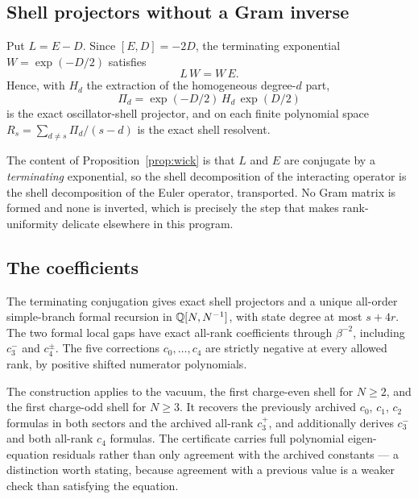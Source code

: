 \subsection{Shell projectors without a Gram inverse}

\begin{proposition}
\label{prop:wick}
Put $L = E - D$. Since $[E, D] = -2D$, the terminating exponential
$W = \exp(-D/2)$ satisfies
\begin{equation}
  L\,W = W\,E .
\end{equation}
Hence, with $H_d$ the extraction of the homogeneous degree-$d$ part,
\begin{equation}
  \Pi_d = \exp(-D/2)\, H_d \,\exp(D/2)
\end{equation}
is the exact oscillator-shell projector, and on each finite polynomial
space $R_s = \sum_{d \neq s} \Pi_d/(s-d)$ is the exact shell resolvent.
\end{proposition}

The content of Proposition~\ref{prop:wick} is that $L$ and $E$ are
conjugate by a \emph{terminating} exponential, so the shell
decomposition of the interacting operator is the shell decomposition of
the Euler operator, transported. No Gram matrix is formed and none is
inverted, which is precisely the step that makes rank-uniformity
delicate elsewhere in this program.

\subsection{The coefficients}

\begin{theorem}
\label{thm:wickcoeffs}
The terminating conjugation gives exact shell projectors and a unique
all-order simple-branch formal recursion in $\mathbb{Q}[N, N^{-1}]$, with state
degree at most $s + 4r$. The two formal local gaps have exact all-rank
coefficients through $\beta^{-2}$, including $c_3^{-}$ and
$c_4^{\pm}$. The five corrections $c_0, \ldots, c_4$ are strictly
negative at every allowed rank, by positive shifted numerator
polynomials.
\end{theorem}

The construction applies to the vacuum, the first charge-even shell for
$N \ge 2$, and the first charge-odd shell for $N \ge 3$. It recovers the
previously archived $c_0$, $c_1$, $c_2$ formulas in both sectors and the
archived all-rank $c_3^{+}$, and additionally derives $c_3^{-}$ and both
all-rank $c_4$ formulas. The certificate carries full polynomial
eigen-equation residuals rather than only agreement with the archived
constants --- a distinction worth stating, because agreement with a
previous value is a weaker check than satisfying the equation.

